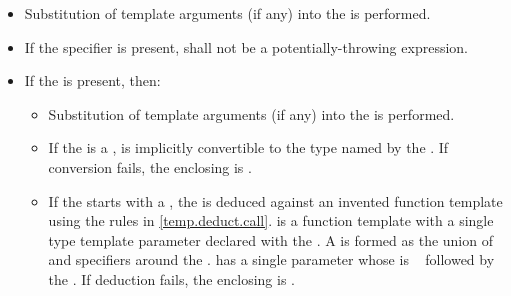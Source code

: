 \begin{itemize}
\item Substitution of template arguments (if any)
into the  is performed.

\item If the  specifier is present,
 shall not be a potentially-throwing expression.

\item If the  is present, then:

\begin{itemize}
\item Substitution of template arguments (if any)
into the  is performed.

\item If the  is a
,
 is implicitly convertible to
the type named by the .
If conversion fails, the enclosing 
is .

\item If the 
starts with a ,
the  is deduced against
an invented function template 
using the rules in \ref{temp.deduct.call}.
 is a  function template
with a single type template parameter 
declared with the .
A  \cv{} is formed
as the union of  and  specifiers
around the .
 has a single parameter
whose  is \cv{}~
followed by the .
If deduction fails,
the enclosing  is .
\end{itemize}
\end{itemize}

